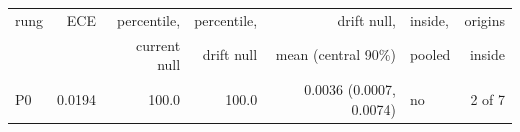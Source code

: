 \begin{tabular}{lrrrrlr}
\toprule
rung & ECE & percentile, & percentile, & drift null, & inside, & origins \\
 & & current null & drift null & mean (central 90\%) & pooled & inside \\
\midrule
P0 & 0.0194 & 100.0 & 100.0 & 0.0036 (0.0007, 0.0074) & no & 2 of 7 \\

\end{tabular}
